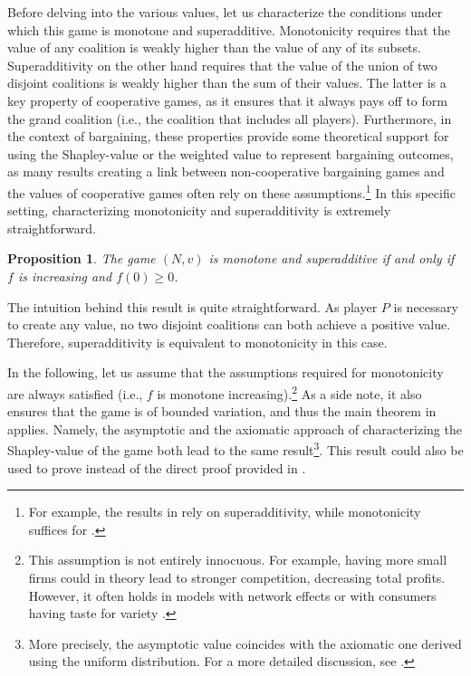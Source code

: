 \documentclass[a4paper]{article}
\newtheorem{proposition}{Proposition}
\begin{document}
Before delving into the various values, let us characterize the conditions under which this game is monotone and superadditive.
Monotonicity requires that the value of any coalition is weakly higher than the value of any of its subsets.
Superadditivity on the other hand requires that the value of the union of two disjoint coalitions is weakly higher than the sum of their values.
The latter is a key property of cooperative games, as it ensures that it always pays off to form the grand coalition (i.e., the coalition that includes all players).
Furthermore, in the context of bargaining, these properties provide some theoretical support for using the Shapley-value or the weighted value to represent bargaining outcomes, as many results creating a link between non-cooperative bargaining games and the values of cooperative games often rely on these assumptions.\footnote{
    For example, the results in \textcite{gul1989bargaining} rely on superadditivity, while monotonicity suffices for \textcite[]{hart1996bargaining}.
}
In this specific setting, characterizing monotonicity and superadditivity is extremely straightforward.
\begin{proposition}
    \label{prop:monotone}
    The game $(N, v)$ is monotone and superadditive if and only if $f$ is increasing and $f(0) \geq 0$.
\end{proposition}
The intuition behind this result is quite straightforward.
As player $P$ is necessary to create any value, no two disjoint coalitions can both achieve a positive value.
Therefore, superadditivity is equivalent to monotonicity in this case.

In the following, let us assume that the assumptions required for monotonicity are always satisfied (i.e., $f$ is monotone increasing).\footnote{
    This assumption is not entirely innocuous.
    For example, having more small firms could in theory lead to stronger competition, decreasing total profits.
    However, it often holds in models with network effects \parencite{rochet2003platform} or with consumers having taste for variety \parencite{anderson2020aggregative}.
}
As a side note, it also ensures that the game is of bounded variation, and thus the main theorem in \textcite{fogelman1980asymptotic} applies.
Namely, the asymptotic and the axiomatic approach of characterizing the Shapley-value of the game both lead to the same result\footnote{
    More precisely, the asymptotic value coincides with the axiomatic one derived using the uniform distribution.
    For a more detailed discussion, see \textcite{fogelman1980asymptotic}.
}.
This result could also be used to prove  instead of the direct proof provided in .
\end{document}
